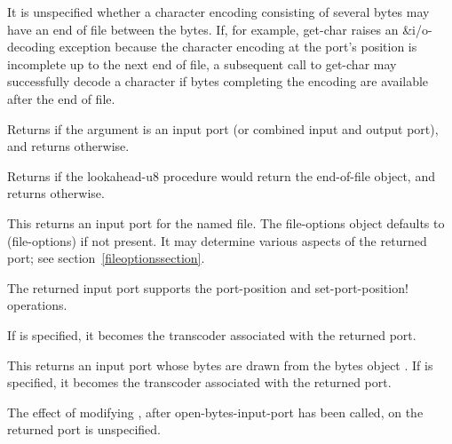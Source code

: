 It is unspecified whether a character encoding consisting of several
bytes may have an end of file between the bytes.  If, for example,
{\cf get-char} raises an {\cf\&i/o-decoding} exception because the
character encoding at the port's position is incomplete up to the next
end of file, a subsequent call to {\cf get-char} may successfully
decode a character if bytes completing the encoding are available
after the end of file.

\begin{entry}{%
}

Returns \schtrue{} if the argument is an input port (or combined input
and output port), and returns \schfalse{} otherwise.
\end{entry}

\begin{entry}{%
}
   
Returns \schtrue{} if the {\cf lookahead-u8} procedure would return
the end-of-file object, and returns \schfalse{} otherwise.
\end{entry}

\begin{entry}{%
}
   
This returns an input port for the named file. The file-options object
defaults to {\cf (file-options)} if not present. It may determine
various aspects of the returned port; see section~\ref{fileoptionssection}.

The returned input port supports the {\cf port-position} and {\cf
  set-port-position!}  operations.

If  is specified, it becomes the transcoder associated
with the returned port.
\end{entry}

\begin{entry}{%
}
   
This returns an input port whose bytes are drawn from the
bytes object .
If  is specified, it becomes the transcoder associated
with the returned port.

The effect of modifying , after {\cf open-bytes-input-port}
has been called, on the returned port is unspecified.
\end{entry}

